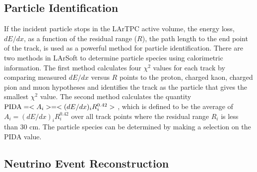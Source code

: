 %


\subsection{Particle Identification}


If the incident particle stops in the LArTPC active volume, the energy
loss, $dE/dx$, as a function of the residual range ($R$), the path
length to the end point of the track, is used as a powerful method for
particle identification. There are two methods in LArSoft to determine
particle species using calorimetric information. The first method
calculates four $\chi^{2}$ values for each track by comparing measured
$dE/dx$ versus $R$ points to the proton, charged kaon, charged pion
and muon hypotheses and identifies the track as the particle that
gives the smallest $\chi^{2}$ value. The second method calculates the
quantity ${\rm{PIDA}} = <A_{i}> = <(dE/dx)_{i}R_{i}^{0.42}>$ \cite{Thomas:1987zz},
which is defined to be the average of $A_{i} =
(dE/dx)_{i}R_{i}^{0.42}$ over all track points where the residual
range $R_{i}$ is less than 30 cm. The particle species can be
determined by making a selection on the PIDA value.


\subsection{Neutrino Event Reconstruction}



